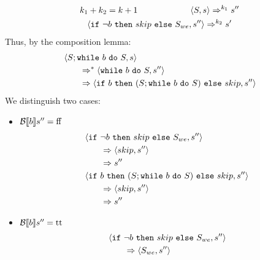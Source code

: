 \begin{exercise}
\begin{enumerate}
\begin{itemize}
\begin{itemize}
\begin{itemize}
                                    \begin{gather*}
                                        k_1 + k_2 = k + 1 \qquad\qquad\qquad \left<S, s\right> \Rightarrow^{k_1} s'' \\
                                        \left<\texttt{if}\ \neg b\ \texttt{then}\ skip\ \texttt{else}\ S_{we}, s''\right> \Rightarrow^{k_2} s'
                                    \end{gather*}
                                    Thus, by the composition lemma:
                                    \begin{align*}
                                        &\left<S; \texttt{while}\ b\ \texttt{do}\ S, s\right>
                                        \\&\qquad\Rightarrow^* \left<\texttt{while}\ b\ \texttt{do}\ S, s''\right>
                                        \\&\qquad\Rightarrow \left<\texttt{if}\ b\ \texttt{then}\ (S; \texttt{while}\ b\ \texttt{do}\ S)\ \texttt{else}\ skip, s''\right>
                                    \end{align*}
                                    We distinguish two cases:
                                    \begin{itemize}
                                        \item $\mathcal{B} \llbracket b \rrbracket s'' = \text{ff}$
                                            \begin{align*}
                                                &\left<\texttt{if}\ \neg b\ \texttt{then}\ skip\ \texttt{else}\ S_{we}, s''\right>
                                                \\&\qquad\Rightarrow \left<skip, s''\right>
                                                \\&\qquad\Rightarrow s''
                                                \\
                                                &\left<\texttt{if}\ b\ \texttt{then}\ (S; \texttt{while}\ b\ \texttt{do}\ S)\ \texttt{else}\ skip, s''\right>
                                                \\&\qquad\Rightarrow \left<skip, s''\right>
                                                \\&\qquad\Rightarrow s''
                                            \end{align*}
                                        \item $\mathcal{B} \llbracket b \rrbracket s'' = \text{tt}$
                                        \begin{align*}
                                            &\instr{\wif{\neg b}{skip}{S_{we}}}{s''}
                                            \\&\qquad\Rightarrow \instr{S_{we}}{s''}

\end{align*}
\end{itemize}
\end{itemize}
\end{itemize}
\end{itemize}
\end{enumerate}
\end{exercise}
